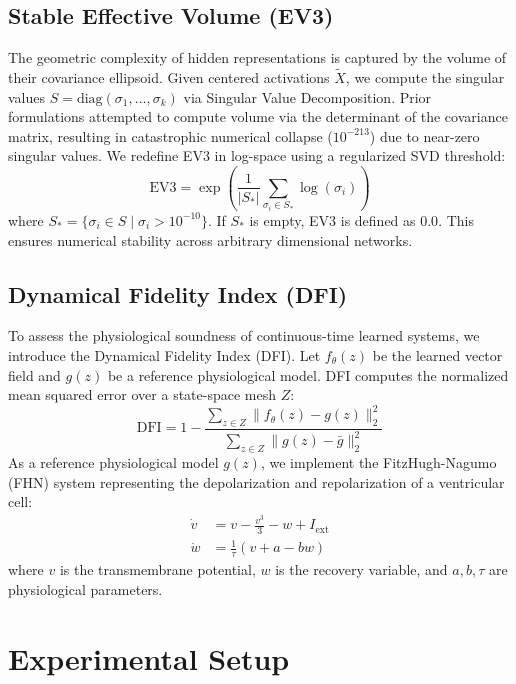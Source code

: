 \documentclass[twocolumn]{article}
\begin{document}
\subsection{Stable Effective Volume (EV3)}
The geometric complexity of hidden representations is captured by the volume of their covariance ellipsoid. Given centered activations $\tilde{X}$, we compute the singular values $S = \text{diag}(\sigma_1, \dots, \sigma_k)$ via Singular Value Decomposition.
Prior formulations attempted to compute volume via the determinant of the covariance matrix, resulting in catastrophic numerical collapse ($10^{-213}$) due to near-zero singular values. We redefine EV3 in log-space using a regularized SVD threshold:
\begin{equation}
    \text{EV3} = \exp\left( \frac{1}{|S_*|} \sum_{\sigma_i \in S_*} \log(\sigma_i) \right)
\end{equation}
where $S_* = \{\sigma_i \in S \mid \sigma_i > 10^{-10}\}$. If $S_*$ is empty, EV3 is defined as $0.0$. This ensures numerical stability across arbitrary dimensional networks.

\subsection{Dynamical Fidelity Index (DFI)}
To assess the physiological soundness of continuous-time learned systems, we introduce the Dynamical Fidelity Index (DFI). Let $f_{\theta}(z)$ be the learned vector field and $g(z)$ be a reference physiological model. DFI computes the normalized mean squared error over a state-space mesh $Z$:
\begin{equation}
    \text{DFI} = 1 - \frac{\sum_{z \in Z} \|f_{\theta}(z) - g(z)\|_2^2}{\sum_{z \in Z} \|g(z) - \bar{g}\|_2^2}
\end{equation}
As a reference physiological model $g(z)$, we implement the FitzHugh-Nagumo (FHN) system representing the depolarization and repolarization of a ventricular cell:
\begin{align}
    \dot{v} &= v - \frac{v^3}{3} - w + I_{\text{ext}} \\
    \dot{w} &= \frac{1}{\tau} (v + a - b w)
\end{align}
where $v$ is the transmembrane potential, $w$ is the recovery variable, and $a, b, \tau$ are physiological parameters.

\section{Experimental Setup}
\label{sec:experiments}
\end{document}

